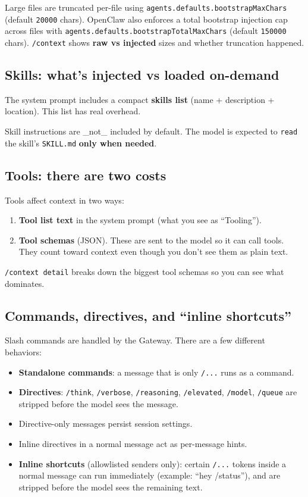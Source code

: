 Large files are truncated per-file using \texttt{agents.defaults.bootstrapMaxChars} (default \texttt{20000} chars). OpenClaw also enforces a total bootstrap injection cap across files with \texttt{agents.defaults.bootstrapTotalMaxChars} (default \texttt{150000} chars). \texttt{/context} shows \textbf{raw vs injected} sizes and whether truncation happened.

\subsection{Skills: what’s injected vs loaded on-demand}


The system prompt includes a compact \textbf{skills list} (name + description + location). This list has real overhead.

Skill instructions are \_not\_ included by default. The model is expected to \texttt{read} the skill’s \texttt{SKILL.md} \textbf{only when needed}.

\subsection{Tools: there are two costs}


Tools affect context in two ways:

\begin{enumerate}
  \item \textbf{Tool list text} in the system prompt (what you see as “Tooling”).
  \item \textbf{Tool schemas} (JSON). These are sent to the model so it can call tools. They count toward context even though you don’t see them as plain text.
\end{enumerate}


\texttt{/context detail} breaks down the biggest tool schemas so you can see what dominates.

\subsection{Commands, directives, and “inline shortcuts”}


Slash commands are handled by the Gateway. There are a few different behaviors:

\begin{itemize}
  \item \textbf{Standalone commands}: a message that is only \texttt{/...} runs as a command.
  \item \textbf{Directives}: \texttt{/think}, \texttt{/verbose}, \texttt{/reasoning}, \texttt{/elevated}, \texttt{/model}, \texttt{/queue} are stripped before the model sees the message.
  \item Directive-only messages persist session settings.
  \item Inline directives in a normal message act as per-message hints.
  \item \textbf{Inline shortcuts} (allowlisted senders only): certain \texttt{/...} tokens inside a normal message can run immediately (example: “hey /status”), and are stripped before the model sees the remaining text.
\end{itemize}


